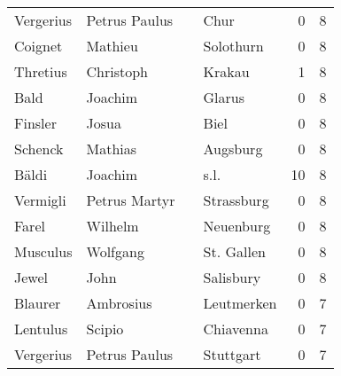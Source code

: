 \begin{center}
\begin{tiny}
\begin{longtabu}{llllrr}
                Vergerius &                      Petrus Paulus &             &                                        Chur &          0 &         8 \\
                  Coignet &                            Mathieu &             &                                   Solothurn &          0 &         8 \\
                 Thretius &                          Christoph &             &                                      Krakau &          1 &         8 \\
                     Bald &                            Joachim &             &                                      Glarus &          0 &         8 \\
                  Finsler &                              Josua &             &                                        Biel &          0 &         8 \\
                  Schenck &                            Mathias &             &                                    Augsburg &          0 &         8 \\
                    Bäldi &                            Joachim &             &                                        s.l. &         10 &         8 \\
                 Vermigli &                      Petrus Martyr &             &                                  Strassburg &          0 &         8 \\
                    Farel &                            Wilhelm &             &                                   Neuenburg &          0 &         8 \\
                 Musculus &                           Wolfgang &             &                                  St. Gallen &          0 &         8 \\
                    Jewel &                               John &             &                                   Salisbury &          0 &         8 \\
                  Blaurer &                          Ambrosius &             &                                  Leutmerken &          0 &         7 \\
                 Lentulus &                             Scipio &             &                                   Chiavenna &          0 &         7 \\
                Vergerius &                      Petrus Paulus &             &                                   Stuttgart &          0 &         7 \\

\end{longtabu}
\end{tiny}
\end{center}
